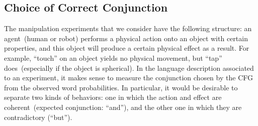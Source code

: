 \begin{table}
    \centering
    \caption{Top sentences generated from the evidence~\eqref{eq:evidence_example}.}
    \label{tab:example_generated_sentences}
\end{table}

\subsection{Choice of Correct Conjunction}

\newcommand{\evidenceProducingAnd}{Action=grasp, ObjVel=medium}

The manipulation experiments that we consider have the following structure: an agent~(human or robot) performs a physical action onto an object with certain properties, and this object will produce a certain physical effect as a result.
For example, ``touch'' on an object yields no physical movement, but ``tap'' does~(especially if the object is spherical).
In the language description associated to an experiment, it makes sense to measure the conjunction chosen by the \acf{CFG} from the observed word probabilities.
In particular, it would be desirable to separate two kinds of behaviors: one in which the action and effect are coherent~(expected conjunction: ``and''), and the other one in which they are contradictory (``but'').

